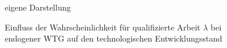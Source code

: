 %
	\begin{figure}[htbp] 
		\hfill{}  eigene Darstellung
		\caption{Einfluss der Wahrscheinlichkeit für qualifizierte Arbeit $\lambda$ bei endogener WTG auf den technologischen Entwicklungsstand}
		\label{lambdaEndo}
	\end{figure}
%
